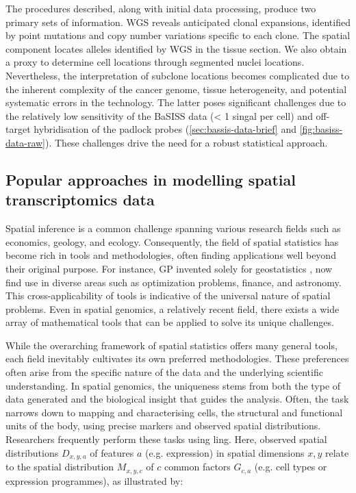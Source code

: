 The procedures described, along with initial data processing, produce two primary sets of information. \ac{WGS} reveals anticipated clonal expansions, identified by point mutations and copy number variations specific to each clone. The spatial component locates alleles identified by \ac{WGS} in the tissue section. We also obtain a proxy to determine cell locations through segmented nuclei locations. Nevertheless, the interpretation of subclone locations becomes complicated due to the inherent complexity of the cancer genome, tissue heterogeneity, and potential systematic errors in the technology. The latter poses significant challenges due to the relatively low sensitivity of the \ac{BaSISS} data (< 1 singal per cell) and off-target hybridisation of the padlock probes (\cref{sec:bassis-data-brief} and \cref{fig:basiss-data-raw}). These challenges drive the need for a robust statistical approach.

\subsection{Popular approaches in modelling spatial transcriptomics data}
\label{sec:basiss-popular}
Spatial inference is a common challenge spanning various research fields such as economics, geology, and ecology. Consequently, the field of spatial statistics has become rich in tools and methodologies, often finding applications well beyond their original purpose. For instance, \acl{GP} invented solely for geostatistics \parencite{Krige1951-mt}, now find use in diverse areas such as optimization problems, finance, and astronomy. This cross-applicability of tools is indicative of the universal nature of spatial problems. Even in spatial genomics, a relatively recent field, there exists a wide array of mathematical tools that can be applied to solve its unique challenges.
    
While the overarching framework of spatial statistics offers many general tools, each field inevitably cultivates its own preferred methodologies. These preferences often arise from the specific nature of the data and the underlying scientific understanding. In spatial genomics, the uniqueness stems from both the type of data generated and the biological insight that guides the analysis. Often, the task narrows down to mapping and characterising cells, the structural and functional units of the body, using precise markers and observed spatial distributions. Researchers frequently perform these tasks using ling. Here, observed spatial distributions $D_{x,y,a}$ of features $a$ (e.g. expression) in spatial dimensions $x, y$ relate to the spatial distribution $M_{x,y,c}$ of $c$ common factors $G_{c,a}$ (e.g. cell types or expression programmes), as illustrated by:


